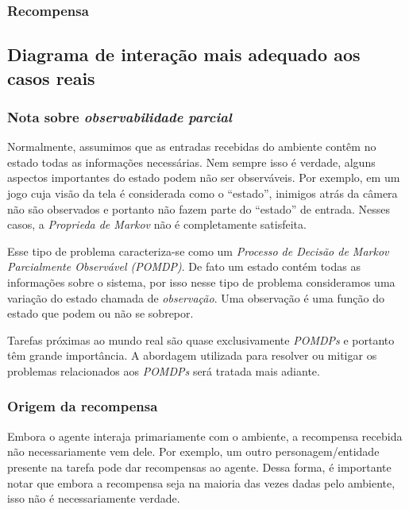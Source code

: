 \documentclass{article}
\begin{document}
            \subsubsection{Recompensa}
        
                
        \subsection{Diagrama de interação mais adequado aos casos reais}
        
            \subsubsection{Nota sobre \emph{observabilidade parcial}}

                Normalmente, assumimos que as entradas recebidas do ambiente contêm no estado todas as informações necessárias. Nem sempre isso é verdade, alguns aspectos importantes do estado podem não ser observáveis. Por exemplo, em um jogo cuja visão da tela é considerada como o ``estado'', inimigos atrás da câmera não são observados e portanto não fazem parte do ``estado'' de entrada. Nesses casos, a \emph{Proprieda de Markov} não é completamente satisfeita. 
                
                Esse tipo de problema caracteriza-se como um \emph{Processo de Decisão de Markov Parcialmente Observável (POMDP)}. De fato um estado contém todas as informações sobre o sistema, por isso nesse tipo de problema consideramos uma variação do estado chamada de \emph{observação}. Uma observação é uma função do estado que podem ou não se sobrepor.
                
                Tarefas próximas ao mundo real são quase exclusivamente \emph{POMDPs} e portanto têm grande importância. A abordagem utilizada para resolver ou mitigar os problemas relacionados aos \emph{POMDPs} será tratada mais adiante.

            \subsubsection{Origem da recompensa}
            
                Embora o agente interaja primariamente com o ambiente, a recompensa recebida não necessariamente vem dele. Por exemplo, um outro personagem/entidade presente na tarefa pode dar recompensas ao agente. Dessa forma, é importante notar que embora a recompensa seja na maioria das vezes dadas pelo ambiente, isso não é necessariamente verdade.
\end{document}
